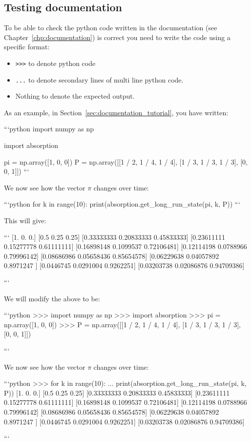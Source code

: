 \subsection{Testing documentation}
\label{\detokenize{building-tools/07-testing/tutorial/main:testing-documentation}}

To be able to check the python code written in the documentation (see
Chapter~\ref{chp:documentation}) is
correct you need to write the code using a specific format:

\begin{itemize}
\item 

\texttt{>>>} to denote python code

\item 

\texttt{...} to denote secondary lines of multi line python code.

\item 

Nothing to denote the expected output.

\end{itemize}


As an example, in Section~\ref{sec:documentation_tutorial}, you have written:

\begin{md}
```python
import numpy as np

import absorption

pi = np.array([1, 0, 0])
P = np.array([[1 / 2, 1 / 4, 1 / 4], [1 / 3, 1 / 3, 1 / 3], [0, 0, 1]])
```

We now see how the vector $\pi$ changes over time:

```python
for k in range(10):
    print(absorption.get_long_run_state(pi, k, P))
```

This will give:

```
[1. 0. 0.]
[0.5  0.25 0.25]
[0.33333333 0.20833333 0.45833333]
[0.23611111 0.15277778 0.61111111]
[0.16898148 0.1099537  0.72106481]
[0.12114198 0.0788966  0.79996142]
[0.08686986 0.05658436 0.85654578]
[0.06229638 0.04057892 0.8971247 ]
[0.0446745 0.0291004 0.9262251]
[0.03203738 0.02086876 0.94709386]

```
\end{md}


We will modify the above to be:

\begin{md}
```python
>>> import numpy as np
>>> import absorption
>>> pi = np.array([1, 0, 0])
>>> P = np.array([[1 / 2, 1 / 4, 1 / 4], [1 / 3, 1 / 3, 1 / 3], [0, 0, 1]])

```

We now see how the vector $\pi$ changes over time:

```python
>>> for k in range(10):
...     print(absorption.get_long_run_state(pi, k, P))
[1. 0. 0.]
[0.5  0.25 0.25]
[0.33333333 0.20833333 0.45833333]
[0.23611111 0.15277778 0.61111111]
[0.16898148 0.1099537  0.72106481]
[0.12114198 0.0788966  0.79996142]
[0.08686986 0.05658436 0.85654578]
[0.06229638 0.04057892 0.8971247 ]
[0.0446745 0.0291004 0.9262251]
[0.03203738 0.02086876 0.94709386]

```
\end{md}


